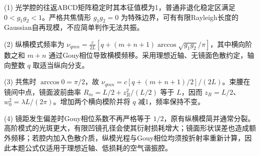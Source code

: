 (1) 光学腔的往返ABCD矩阵稳定时其本征值模为1，普通非退化稳定区满足 \(\boxed{0<g_1g_2<1}\)。严格共焦情形 \(g_1g_2=0\) 为特殊边界，可有有限Rayleigh长度的Gaussian自再现模，不应简单判作无法共振。

(2) 纵横模式频率为 \(\boxed{\nu_{qmn}=\frac c{2L}[q+(m+n+1)\arccos\sqrt{g_1g_2}/\pi]}\)，其中横向阶数之和 \(m+n\) 通过Gouy相位导致横模频移。采用理想近轴、无镜面色散约定，轴向整数 \(q\) 取适当纵向分支。

(3) 共焦时 \(\arccos0=\pi/2\)，故 \(\nu_{qmn}=c[q+(m+n+1)/2]/(2L)\)。束腰在镜间中点，镜面波前曲率 \(R_m=L/2+z_R^2/(L/2)\) 等于 \(L\)，因而 \(\boxed{z_R=L/2}\)、\(\boxed{w_0^2=\lambda L/(2\pi)}\)。增加两个横向模阶并将 \(q\) 减1，频率保持不变。

(4) 镜距发生偏差时Gouy相位系数不再严格等于 \(1/2\)，原有纵横模简并通常分裂。高阶模式的光斑更大，有限凹镜孔径会使其衍射损耗增大；镜面形状误差也造成额外频移；若腔内加入色散介质，纵模光程与Gouy相位均须按折射率重新计算，因此本题公式仅适用于理想近轴、低损耗的空气谐振腔。
